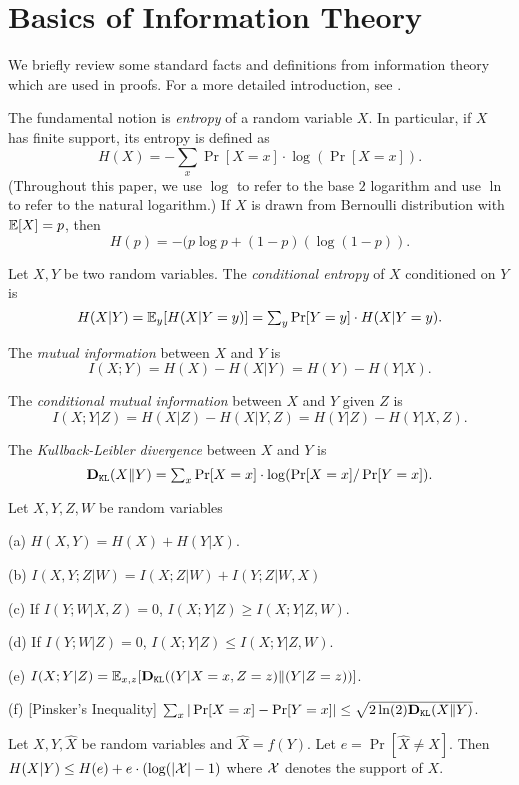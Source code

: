 \section{Basics of Information Theory}

We briefly review some standard facts and definitions from information theory which are used in proofs. For a more detailed introduction, see \cite{CK11}. 

The fundamental notion is \emph{entropy} of a random variable $X$. In particular, if $X$ has finite support, its entropy is defined as 
\[ H(X) = \textstyle - \sum_{x} \Pr[X = x]\cdot  \log(\Pr[X = x]). \]
(Throughout this paper, we use $\log$ to refer to the base $2$ logarithm and use $\ln$ to refer to the natural logarithm.) If $X$ is drawn from Bernoulli distribution with $\mathbb{E}[X]=p$, then 
    \[ H(p) = -(p\log p + (1-p)(\log(1-p)). \]

Let $X,Y$ be two random variables. The \emph{conditional entropy} of $X$ conditioned on $Y$ is 
\[ H(X|Y) 
    = \mathbb{E}_y[H(X|Y = y)] 
    = \textstyle \sum_{y} \Pr[Y=y]\cdot H(X|Y = y). \]

The \emph{mutual information} between $X$ and $Y$ is 
\[ I(X;Y) = H(X) - H(X|Y) = H(Y) - H(Y|X).\]

The \emph{conditional mutual information} between $X$ and $Y$ given $Z$ is  
\[ I(X;Y|Z) = H(X|Z) - H(X|Y,Z) = H(Y|Z) - H(Y|X,Z).\]


The \emph{Kullback-Leibler divergence} between $X$ and $Y$ is 
\[ \textbf{D}_{\mathtt{KL}}(X\| Y)\textstyle  = \sum_x \Pr[X = x] \cdot \log(\Pr[X = x] / \Pr[Y = x]).\]


\begin{lemma}
Let $X,Y,Z,W$ be random variables 
\begin{OneLiners}
\item[(a)] $H(X,Y) = H(X) + H(Y|X)$.
\item[(b)] $I(X,Y;Z|W) = I(X;Z|W) + I(Y;Z|W,X)$
\item[(c)] If $I(Y;W|X,Z) = 0$, $I(X;Y|Z) \geq I(X;Y|Z,W)$.
\item[(d)] If $I(Y;W|Z) = 0$, $I(X;Y|Z) \leq I(X;Y|Z,W)$.
\item[(e)] $I(X;Y|Z) = \mathbb{E}_{x,z}[\textbf{D}_{\mathtt{KL}}((Y|X = x, Z=z)\|(Y|Z=z))]$.
\item[(f)] [Pinsker's Inequality] $\sum_x | \Pr[X=x] - \Pr[Y=x]| \leq \sqrt{2 \ln(2) \textbf{D}_{\mathtt{KL}}(X\|Y)}$.
\end{OneLiners}
\end{lemma}

\begin{lemma}
Let $X,Y,\hat{X}$ be random variables and $\hat{X} = f(Y)$. Let $e = \Pr[\hat{X} \neq X]$. Then $H(X|Y) \leq H(e) + e \cdot (\log(|\mathcal{X}|-1)$ where $\mathcal{X}$ denotes the support of $X$.
\end{lemma} 